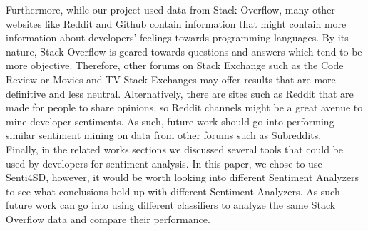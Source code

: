 \documentclass[conference]{IEEEtran}
\begin{document}
Furthermore, while our project used data from Stack Overflow, many other websites like Reddit and Github contain information that might contain more information about developers' feelings towards programming languages. By its nature, Stack Overflow is geared towards questions and answers which tend to be more objective. Therefore, other forums on Stack Exchange such as the Code Review or Movies and TV Stack Exchanges may offer results that are more definitive and less neutral. Alternatively, there are sites such as Reddit that are made for people to share opinions, so Reddit channels might be a great avenue to mine developer sentiments. As such, future work should go into performing similar sentiment mining on data from other forums such as Subreddits. \\

Finally, in the related works sections we discussed several tools that could be used by developers for sentiment analysis. In this paper, we chose to use Senti4SD, however, it would be worth looking into different Sentiment Analyzers to see what conclusions hold up with different Sentiment Analyzers. As such future work can go into using different classifiers to analyze the same Stack Overflow data and compare their performance.
\end{document}
